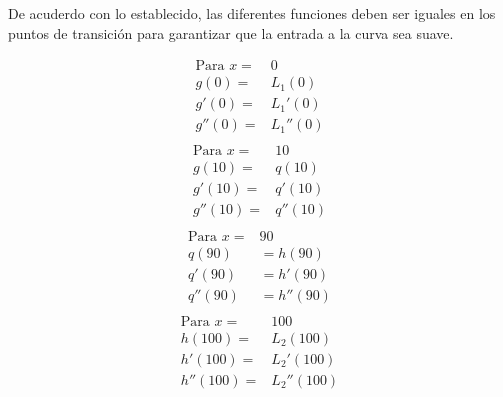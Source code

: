 De acuderdo con lo establecido, las diferentes funciones deben ser iguales en los puntos de transición para garantizar que la entrada a la curva sea suave.

\begin{multicols}{4}
	\noindent
	\begin{align*}
		\text{Para } x = & 0        \\
		g(0)  =          & L_1(0)   \\
		g'(0) =          & L_1'(0)  \\
		g''(0)=          & L_1''(0) \\
	\end{align*}
	\columnbreak
	\begin{align*}
		\text{Para } x = & 10      \\
		g(10)  =         & q(10)   \\
		g'(10) =         & q'(10)  \\
		g''(10)=         & q''(10) \\
	\end{align*}
	\columnbreak
	\begin{align*}
		\text{Para } x = & 90       \\
		q(90)            & =h(90)   \\
		q'(90)           & =h'(90)  \\
		q''(90)          & =h''(90) \\
	\end{align*}
	\columnbreak
	\begin{align*}
		\text{Para } x = & 100        \\
		h(100)  =        & L_2(100)   \\
		h'(100) =        & L_2'(100)  \\
		h''(100)=        & L_2''(100) \\
	\end{align*}
\end{multicols}

